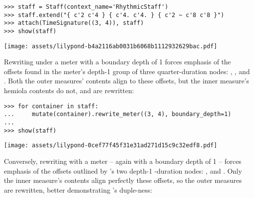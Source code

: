 \begin{abjadbookoutput}
\begin{singlespacing}
\vspace{-0.5\baselineskip}
\begin{verbatim}
>>> staff = Staff(context_name='RhythmicStaff')
>>> staff.extend("{ c'2 c'4 } { c'4. c'4. } { c'2 ~ c'8 c'8 }")
>>> attach(TimeSignature((3, 4)), staff)
>>> show(staff)
\end{verbatim}
\noindent\texttt{[image: assets/lilypond-b4a2116ab0031b6068b1112932629bac.pdf]}
\end{singlespacing}
\end{abjadbookoutput}

\noindent Rewriting under a  meter with a boundary depth of 1
forces emphasis of the offsets found in the  meter's depth-1 group
of three quarter-duration nodes: , ,  and
. Both the outer measures' contents align to these offsets, but the
inner measure's hemiola contents do not, and are rewritten:

\begin{comment}
<abjad>
for container in staff:
    mutate(container).rewrite_meter((3, 4), boundary_depth=1)

show(staff)
</abjad>
\end{comment}

\begin{abjadbookoutput}
\begin{singlespacing}
\vspace{-0.5\baselineskip}
\begin{verbatim}
>>> for container in staff:
...     mutate(container).rewrite_meter((3, 4), boundary_depth=1)
...
>>> show(staff)
\end{verbatim}
\noindent\texttt{[image: assets/lilypond-0cef77f45f31e31ad271d15c9c32edf8.pdf]}
\end{singlespacing}
\end{abjadbookoutput}

\noindent Conversely, rewriting with a  meter -- again with a
boundary depth of 1 -- forces emphasis of the offsets outlined by
's two depth-1 -duration nodes: ,
 and . Only the inner measure's contents align
perfectly these offsets, so the outer measures are rewritten, better
demonstrating 's duple-ness:

